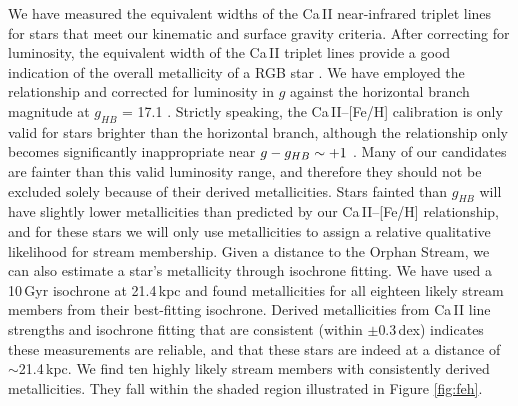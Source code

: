 \documentclass{emulateapj}
\begin{document}
We have measured the equivalent widths of the Ca\,\textsc{II} near-infrared triplet lines for stars that meet our kinematic and surface gravity criteria. After correcting for luminosity, the equivalent width of the Ca\,\textsc{II} triplet lines provide a good indication of the overall metallicity of a RGB star \citep{Amandroff;Da_Costa_1991}. We have employed the \citet{Starkenburg;et-al_2010} relationship and corrected for luminosity in $g$ against the horizontal branch magnitude at $g_{HB}$ = 17.1 \citep{Newberg;et-al_2010}. Strictly speaking, the Ca\,\textsc{II}\---[Fe/H] calibration is only valid for stars brighter than the horizontal branch, although the relationship only becomes significantly inappropriate near $g \-- g_{HB} \sim +1$ \citep{Saviane;et-al_2012}. Many of our candidates are fainter than this valid luminosity range, and therefore they should not be excluded solely because of their derived metallicities. Stars fainted than $g_{HB}$ will have slightly lower metallicities than predicted by our Ca\,\textsc{II}\---[Fe/H] relationship, and for these stars we will only use metallicities to assign a relative qualitative likelihood for stream membership.
Given a distance to the Orphan Stream, we can also estimate a star's metallicity through isochrone fitting. We have used a 10\,Gyr \citet{Girardi;et-al_2008} isochrone at 21.4\,kpc \citep{Newberg;et-al_2010} and found metallicities for all eighteen likely stream members from their best-fitting isochrone. Derived metallicities from Ca\,\textsc{II} line strengths and isochrone fitting that are consistent (within $\pm0.3$\,dex) indicates these measurements are reliable, and that these stars are indeed at a distance of $\sim$21.4\,kpc. We find ten highly likely stream members with consistently derived metallicities. They fall within the shaded region illustrated in Figure \ref{fig:feh}. 
\end{document}
